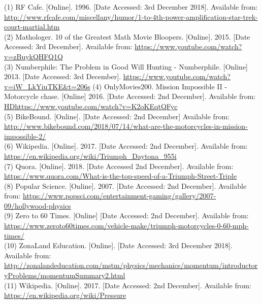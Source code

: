 \documentclass{article}
\begin{document}
 \noindent (1) RF Cafe. [Online]. 1996. [Date Accessed: 3rd December 2018]. Available from: \url{http://www.rfcafe.com/miscellany/humor/1-to-4th-power-amplification-star-trek-court-martial.htm}\\
 (2) Mathologer. 10 of the Greatest Math Movie Bloopers. [Online]. 2015. [Date Accessed: 3rd December]. Available from: \url{https://www.youtube.com/watch?v=zBuykQHFQ1Q}\\
 (3) Numberphile: The Problem in Good Will Hunting - Numberphile. [Online] 2013. [Date Accessed: 3rd December]. \url{https://www.youtube.com/watch?v=iW_LkYiuTKE&t=206s}
 (4) OnlyMovies200. Mission Impossible II - Motorcycle chase. [Online] 2016. [Date Accessed: 2nd December]. Available from: \url{HDhttps://www.youtube.com/watch?v=K2oKEqtQFyc}\\
 (5) BikeBound. [Online]. [Date Accessed: 2nd December] Available from: \url{http://www.bikebound.com/2018/07/14/what-are-the-motorcycles-in-mission-impossible-2/}\\
 (6) Wikipedia. [Online]. 2017. [Date Accessed: 2nd December]. Available from: \url{https://en.wikipedia.org/wiki/Triumph_Daytona_955i}\\
 (7) Quora. [Online]. 2018. [Date Accessed 2nd December]. Available from: \url{https://www.quora.com/What-is-the-top-speed-of-a-Triumph-Street-Triple}\\
 (8) Popular Science. [Online]. 2007. [Date Accessed: 2nd December]. Available from: \url{https://www.popsci.com/entertainment-gaming/gallery/2007-09/hollywood-physics}\\
 (9) Zero to 60 Times. [Online] [Date Accessed: 2nd December]. Available from: \url{https://www.zeroto60times.com/vehicle-make/triumph-motorcycles-0-60-mph-times/}\\
 (10) ZonaLand Education. [Online]. [Date Accessed: 3rd December 2018]. Available from: \url{http://zonalandeducation.com/mstm/physics/mechanics/momentum/introductoryProblems/momentumSummary2.html}\\
 (11) Wikipedia. [Online]. 2017. [Date Accessed: 2nd December]. Available from: \url{https://en.wikipedia.org/wiki/Pressure}
 
\end{document}

